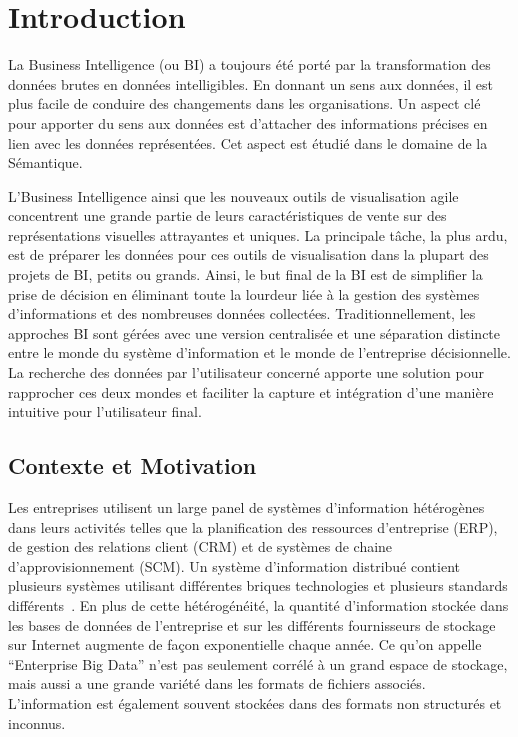 \chapter{Introduction}
\graphicspath{{summary/figures/}}
\newcommand{\bi}{Business Intelligence }

La Business Intelligence (ou BI) a toujours \'{e}t\'{e} port\'{e} par la transformation des donn\'{e}es brutes en donn\'{e}es intelligibles. En donnant un sens aux donn\'{e}es, il est plus facile de conduire des changements dans les organisations. Un aspect cl\'{e} pour apporter du sens aux donn\'{e}es est d'attacher des informations pr\'{e}cises en lien avec les donn\'{e}es repr\'{e}sent\'{e}es. Cet aspect est \'{e}tudi\'{e} dans le domaine de la S\'{e}mantique.

L'\bi ainsi que les nouveaux outils de visualisation agile concentrent une grande partie de leurs caract\'{e}ristiques de vente sur des repr\'{e}sentations visuelles attrayantes et uniques. La principale tâche, la plus ardu, est de pr\'{e}parer les donn\'{e}es pour ces outils de visualisation dans la plupart des projets de BI, petits ou grands. Ainsi, le but final de la BI est de simplifier la prise de d\'{e}cision en \'{e}liminant toute la lourdeur li\'{e}e à la gestion des syst\`{e}mes d'informations et des nombreuses donn\'{e}es collect\'{e}es. Traditionnellement, les approches BI sont g\'{e}r\'{e}es avec une version centralis\'{e}e et une s\'{e}paration distincte entre le monde du syst\`{e}me d'information et le monde de l'entreprise d\'{e}cisionnelle. La recherche des donn\'{e}es par l'utilisateur concern\'{e} apporte une solution pour rapprocher ces deux mondes et faciliter la capture et int\'{e}gration d'une mani\`{e}re intuitive pour l'utilisateur final.

\section{Contexte et Motivation}

Les entreprises utilisent un large panel de syst\`{e}mes d'information h\'{e}t\'{e}rog\`{e}nes dans leurs activit\'{e}s telles que la planification des ressources d'entreprise (ERP), de gestion des relations client (CRM) et de syst\`{e}mes de chaine d'approvisionnement (SCM). Un syst\`{e}me d'information distribu\'{e} contient plusieurs syst\`{e}mes utilisant diff\'{e}rentes briques technologies et plusieurs standards diff\'{e}rents~\cite{Mihindukulasooriya:COLD:13}. En plus de cette h\'{e}t\'{e}rog\'{e}n\'{e}it\'{e}, la quantit\'{e} d'information stock\'{e}e dans les bases de donn\'{e}es de l'entreprise et sur les diff\'{e}rents fournisseurs de stockage sur Internet augmente de façon exponentielle chaque ann\'{e}e. Ce qu'on appelle ``Enterprise Big Data'' n'est pas seulement corr\'{e}l\'{e} à un grand espace de stockage, mais aussi a une grande vari\'{e}t\'{e} dans les formats de fichiers associ\'{e}s. L'information est \'{e}galement souvent stock\'{e}es dans des formats non structur\'{e}s et inconnus.

